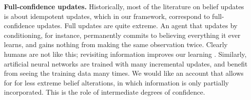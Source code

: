 \textbf{Full-confidence updates.}
Historically, most of the literature on belief updates is about 
	idempotent updates, which in our framework, correspond to full-confidence updates.
Full updates are quite extreme.
An agent that updates by conditioning, for instance,
permanently commits to believing everything it ever learns,
and gains nothing from making the same observation twice.
Clearly humans are not like this; revisiting information
 	improves our learning \parencite{ausubel1965effect}.
Similarly, artificial neural networks are trained with
 	many incremental updates, and benefit from seeing 
	the training data many times.
We would like an account that allows for for less extreme belief alterations,
in which information is only partially incorporated.
This is the role of intermediate degrees of confidence.

